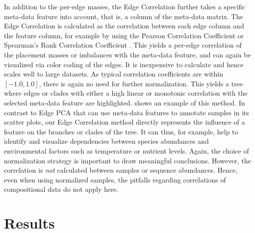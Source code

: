 In addition to the per-edge masses, the Edge Correlation further
takes a specific meta-data feature into account, that is, a column of the meta-data matrix.
The Edge Correlation is calculated as the correlation between each edge column and the feature column,
for example by using the Pearson Correlation Coefficient or Spearman's Rank Correlation Coefficient \cite{Everitt2010}.
This yields a per-edge correlation of the placement masses or imbalances with the meta-data feature,
and can again be visualized via color coding of the edges.
It is inexpensive to calculate and hence scales well to large datasets.
As typical correlation coefficients are within $[ -1.0, 1.0 ]$, there is again no need for further normalization.
This yields a tree where edges or clades with either a high linear or monotonic correlation
with the selected meta-data feature are highlighted.
 shows an example of this method.
In contrast to Edge PCA \cite{Matsen2011a} that can use meta-data features to annotate samples in its scatter plots,
our Edge Correlation method directly represents the influence of a feature on the branches or clades of the tree.
It can thus, for example, help to identify and visualize dependencies
between species abundances and environmental factors such as temperature or nutrient levels.
Again, the choice of normalization strategy is important to draw meaningful conclusions.
However, the correlation is \emph{not} calculated between samples or sequence abundances.
Hence, even when using normalized samples, %
the pitfalls regarding correlations of compositional data \cite{Lovell2015} do not apply here.



\section{Results}
\label{ch:Visualization:sec:Results}

